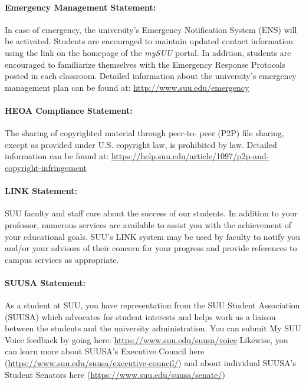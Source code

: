\documentclass[12pt, letterpaper]{article}
\begin{document}
\paragraph{Emergency Management Statement:}
In case of emergency, the university's Emergency Notification System (ENS) will be activated. Students are encouraged to maintain updated contact information using the link on the homepage of the \emph{mySUU} portal. In addition, students are encouraged to familiarize themselves with the Emergency Response Protocols posted in each classroom. Detailed information about the university's emergency management plan can be found at: \href{http://www.suu.edu/emergency}{http://www.suu.edu/emergency}

\paragraph{HEOA Compliance Statement:}
The sharing of copyrighted material through peer-to- peer (P2P) file sharing, except as provided under U.S. copyright law, is prohibited by law. Detailed information can be found at: \href{https://help.suu.edu/article/1097/p2p-and-copyright-infringement}{https://help.suu.edu/article/1097/p2p-and-copyright-infringement}

\paragraph{LINK Statement:}
SUU faculty and staff care about the success of our students. In addition to your professor, numerous services are available to assist you with the achievement of your educational goals. SUU's LINK system may be used by faculty to notify you and/or your advisors of their concern for your progress and provide references to campus services as appropriate.

\paragraph{SUUSA Statement:}
As a student at SUU, you have representation from the SUU Student Association (SUUSA) which advocates for student interests and helps work as a liaison between the students and the university administration. You can submit My SUU Voice feedback by going here: \href{https://www.suu.edu/suusa/voice}{https://www.suu.edu/suusa/voice} Likewise, you can learn more about SUUSA's Executive Council here (\href{https://www.suu.edu/suusa/executive-council/}{https://www.suu.edu/suusa/executive-council/}) and about individual SUUSA's Student Senators here (\href{https://www.suu.edu/suusa/senate/}{https://www.suu.edu/suusa/senate/})
\end{document}
